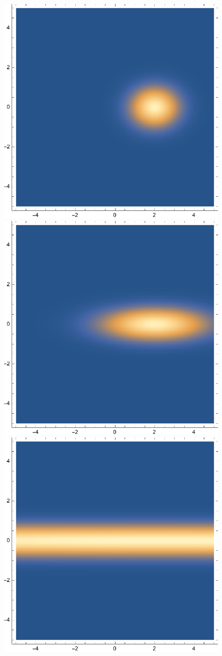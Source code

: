 \documentclass{article}
\theoremstyle{definition}
\begin{document}
\begin{enumerate}[label=(\alph*)]
\begin{itemize}
\begin{figure}[!htb]
	\centering
	\begin{minipage}{.3\textwidth}
  	\centering
  	\includegraphics[width=.55\linewidth]{figures/Q2-z-02.eps}
	\end{minipage}%
	\begin{minipage}{.3\textwidth}
  	\centering
  	\includegraphics[width=.55\linewidth]{figures/Q2-z-12.eps}
	\end{minipage}
	\begin{minipage}{.3\textwidth}
  	\centering
  	\includegraphics[width=.55\linewidth]{figures/Q2-z-40.eps}
	\end{minipage}
\end{figure} 


\end{itemize}
\end{enumerate}
\end{document}
